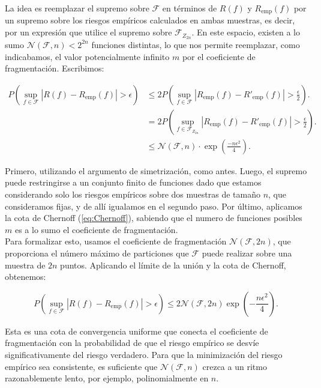 \documentclass{article}
\begin{document}
La idea es reemplazar el supremo sobre \(\mathcal{F}\) en términos de \(R(f)\) y 
\(R_{\text{emp}}(f)\) por un supremo sobre los riesgos empíricos calculados en ambas muestras, es decir, por un expresión
que utilice el supremo sobre \(\mathcal{F}_{Z_{2n}}\). En este espacio, existen a lo sumo $\mathcal{N}(\mathcal{F}, n)<2^{2n}$
funciones distintas, lo que nos permite reemplazar, como indicabamos, el valor potencialmente infinito $m$ por el coeficiente de 
fragmentación. Escribimos:

\[
\begin{aligned}
P\left(\sup_{f \in \mathcal{F}} |R(f) - R_{\text{emp}}(f)| > \epsilon\right) &\leq 
2P\left(\sup_{f \in \mathcal{F}} |R_{\text{emp}}(f) - R'_{\text{emp}}(f)| > \frac{\epsilon}{2}\right).\\
& = 2P\left(\sup_{f \in \mathcal{F}_{Z_{2n}}} |R_{\text{emp}}(f) - R'_{\text{emp}}(f)| > \frac{\epsilon}{2}\right).\\
& \leq  \mathcal{N}(\mathcal{F}, n)\cdot \exp\left(\frac{-n\epsilon^2}{4}\right).
\end{aligned}
\]

Primero, utilizando el argumento de simetrización, como antes. Luego, el supremo puede restringirse a un conjunto finito de funciones
dado que estamos considerando solo los riesgos empíricos sobre dos muestras de tamaño $n$, que consideramos fijas, y de allí igualamos
en el segundo paso. Por último, aplicamos la cota de Chernoff (\ref{eq:Chernoff}), sabiendo que el numero de funciones
posibles $m$ es a lo sumo el coeficiente de fragmentación.\\

Para formalizar esto, usamos el coeficiente de fragmentación \(\mathcal{N}(\mathcal{F}, 2n)\), que proporciona el número máximo 
de particiones que \(\mathcal{F}\) puede realizar sobre una muestra de \(2n\) puntos. Aplicando el límite de la unión 
y la cota de Chernoff, obtenemos:

\begin{equation} 
    P\left(\sup_{f \in \mathcal{F}} |R(f) - R_{\text{emp}}(f)| > \epsilon \right) \leq 
    2\mathcal{N}(\mathcal{F}, 2n) \exp\left(-\frac{n\epsilon^2}{4}\right). \label{eq: cota convergencia coeficiente fragmentacion}
\end{equation}

Esta es una cota de convergencia uniforme que conecta el coeficiente de fragmentación con la probabilidad de 
que el riesgo empírico se desvíe significativamente del riesgo verdadero. Para que la minimización del riesgo 
empírico sea consistente, es suficiente que $\mathcal{N}(\mathcal{F}, n)$ crezca a un ritmo razonablemente lento, por ejemplo, 
polinomialmente en \(n\).\\
\end{document}
